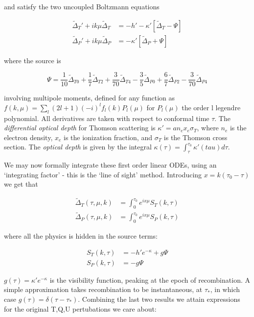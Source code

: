 \documentclass[a4paper,11pt]{article}
\begin{document}
and satisfy the two uncoupled Boltzmann equations

\begin{align}
\tilde{\Delta}_T'+ik\mu \tilde{\Delta}_T &= -h' -\kappa'[\tilde{\Delta}_T - \Psi]\\
\tilde{\Delta}_P'+ik\mu\tilde{\Delta}_P &= -\kappa'[\tilde{\Delta}_P + \Psi]
\end{align}

where the source is

\begin{equation}
\Psi = \frac{1}{10}\tilde{\Delta}_{T0} + \frac{1}{7}\tilde{\Delta}_{T2} + \frac{3}{70}\tilde{\Delta}_{T4} - \frac{3}{5}\tilde{\Delta}_{P0} + \frac{6}{7}\tilde{\Delta}_{P2} - \frac{3}{70}\tilde{\Delta}_{P4}
\end{equation}


involving multipole moments, defined for any function as $f(k, \mu) = \sum_l (2l+1)(-i)^lf_l(k)P_l(\mu)$ for $P_l(\mu)$ the order l legendre polynomial. All derivatives are taken with respect to conformal time $\tau$. The \textit{differential optical depth} for Thomson scattering is $\kappa'=an_ex_e\sigma_T$, where $n_e$ is the electron density, $x_e$ is the ionization fraction, and $\sigma_T$ is the Thomson cross section. The \textit{optical depth} is given by the integral $\kappa(\tau) = \int_\tau^{\tau_0} \kappa'(tau)d\tau$. 


We may now formally integrate these first order linear ODEs, using an `integrating factor' - this is the `line of sight' method. Introducing $x=k(\tau_0-\tau)$ we get that 

\begin{align}
\tilde{\Delta}_T(\tau,\mu,k) &= \int_0^{\tau_0} e^{ix\mu}S_T(k,\tau)\\
\tilde{\Delta}_P(\tau,\mu,k) &= \int_0^{\tau_0} e^{ix\mu}S_P(k,\tau)
\end{align}

where all the physics is hidden in the source terms:

\begin{align}
S_T(k,\tau) &= -h'e^{-\kappa}+g\Psi\\
S_P(k,\tau) &= -g\Psi
\end{align}

$g(\tau) = \kappa'e^{-\kappa}$ is the visibility function, peaking at the epoch of recombination. A simple approximation takes recombination to be instantaneous, at $\tau_*$, in which case $g(\tau) = \delta(\tau-\tau_*)$. Combining the last two results we attain expressions for the original T,Q,U pertubations we care about:
\end{document}
